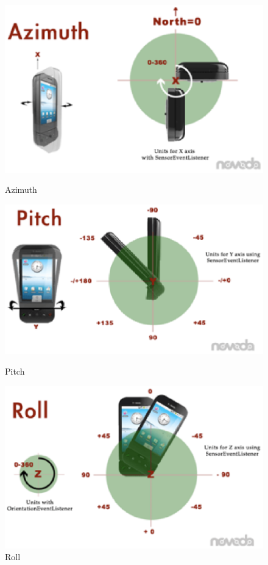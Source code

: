 \documentclass[12pt]{article}
\begin{document}
\begin{figure}[ht]
\begin{minipage}[b]{0.3\textwidth}
\centering
\includegraphics[width=\textwidth]{azimuth}
\caption{Azimuth}
\label{fig:azimuth}
\end{minipage}
\begin{minipage}[b]{0.3\textwidth}
\centering
\includegraphics[width=\textwidth]{pitch}
\caption{Pitch}
\label{fig:pitch}
\end{minipage}
\begin{minipage}[b]{0.3\textwidth}
\centering
\includegraphics[width=\textwidth]{roll}
\caption{Roll}
\label{fig:roll}
\end{minipage}
\end{figure}
\end{document}
